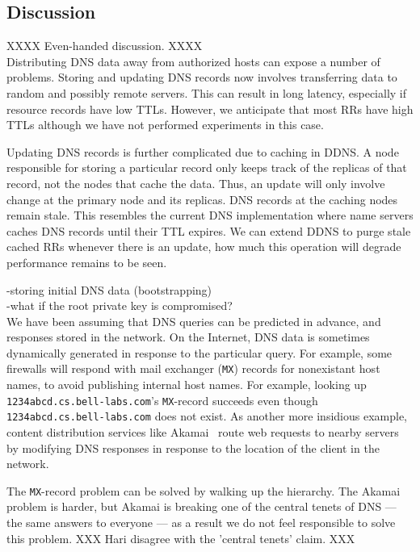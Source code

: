 \subsection{Discussion}
\label{sec:discuss}

XXXX Even-handed discussion. XXXX\\

Distributing DNS data away from authorized hosts can expose
a number of problems. Storing and updating DNS records now
involves transferring data to random and possibly remote servers.
This can result in long latency, especially if resource records
have low TTLs. However, we anticipate that most RRs have 
high TTLs although we have not performed experiments in this case.

Updating DNS records is further complicated due to caching 
in DDNS. A node responsible for storing a particular record 
only keeps track of the replicas of that record, not the nodes
that cache the data. Thus, an update will only involve change 
at the primary node and its replicas. DNS records at the caching 
nodes remain stale. This resembles the current DNS implementation
where name servers caches DNS records until their TTL expires.
We can extend DDNS to purge stale cached RRs whenever there is an
update, how much this operation will degrade performance remains
to be seen.

-storing initial DNS data (bootstrapping) \\

-what if the root private key is compromised?\\

We have been assuming that DNS queries can be predicted in advance,
and responses stored in the network.
On the Internet, DNS data is sometimes dynamically generated in response
to the particular query.  
For example, some firewalls will respond with mail exchanger ({\tt MX}) records
for nonexistant host names, to avoid publishing internal host names.
For example, looking up {\tt 1234abcd.cs.bell-labs.com}'s {\tt MX}-record
succeeds even though {\tt 1234abcd.cs.bell-labs.com} does not exist.
As another more insidious example, content distribution services like 
Akamai~\cite{akamai}
route web requests to nearby servers by modifying DNS responses in response
to the location of the client in the network.

The {\tt MX}-record problem can be solved by walking up the hierarchy.
The Akamai problem is harder, but Akamai is breaking one of the 
central tenets of DNS --- the same answers to everyone --- as a
result we do not feel responsible to solve this problem. 
XXX Hari disagree with the 'central tenets' claim. XXX


